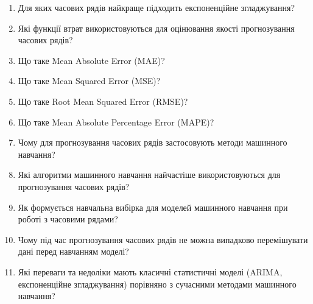 \begin{enumerate}
\item Для яких часових рядів найкраще підходить експоненційне згладжування?
\item Які функції втрат використовуються для оцінювання якості прогнозування часових рядів?
\item Що таке Mean Absolute Error (MAE)?
\item Що таке Mean Squared Error (MSE)?
\item Що таке Root Mean Squared Error (RMSE)?
\item Що таке Mean Absolute Percentage Error (MAPE)?
\item Чому для прогнозування часових рядів застосовують методи машинного навчання?
\item Які алгоритми машинного навчання найчастіше використовуються для прогнозування часових рядів?
\item Як формується навчальна вибірка для моделей машинного навчання при роботі з часовими рядами?
\item Чому під час прогнозування часових рядів не можна випадково перемішувати дані перед навчанням моделі?
\item Які переваги та недоліки мають класичні статистичні моделі (ARIMA, експоненційне згладжування) порівняно з сучасними методами машинного навчання?
\end{enumerate}
